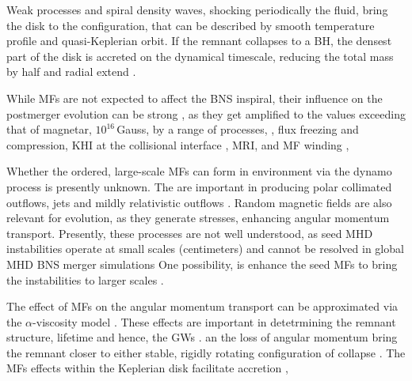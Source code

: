 Weak processes and spiral density waves, shocking periodically the fluid, 
bring the disk to the configuration, that can be described by smooth 
temperature profile 
and quasi-Keplerian orbit.
%
If the remnant collapses to a \ac{BH}, the densest part of the disk is 
accreted on the dynamical timescale, reducing the total mass by half 
and radial extend \cite{70}.

While \acp{MF} are not expected to affect the \ac{BNS} inspiral, their influence 
on the postmerger evolution can be strong \cite{73,19}, as they get amplified 
to the values exceeding that of magnetar, $10^{16}\,$Gauss, by a range of processes, 
\eg, flux freezing and compression, \ac{KHI} at the collisional interface \cite{74},
\ac{MRI}, \cite{73,19} and \ac{MF} winding \cite{73},
%

Whether the ordered, large-scale \acp{MF} can form in \pmerg{} environment 
via the dynamo process is presently unknown. The are important in producing 
polar collimated outflows, jets \cite{75,76} and mildly relativistic outflows
\cite{77,78}. Random magnetic fields are also relevant for \pmerg{} evolution, 
as they generate stresses, enhancing angular momentum transport. Presently, 
these processes are not well understood, as seed \ac{MHD} instabilities operate at 
small scales (centimeters) and cannot be resolved in global \ac{MHD} \ac{BNS} merger 
simulations
One possibility, is enhance the seed \acp{MF} to bring the instabilities to larger 
scales \cite{74,19}.

The effect of \acp{MF} on the angular momentum transport can be approximated via 
the $\alpha$-viscosity model \cite{Shakura:1972te}. These effects are important 
in detetrmining the remnant structure, lifetime and hence, the \pmerg{} \acp{GW} 
\cite{20,79}. 
an the loss of angular momentum bring the remnant closer to either stable, 
rigidly rotating configuration of collapse \cite{80}. 
%
The \acp{MF} effects within the Keplerian disk facilitate accretion \cite{24,21,78,81},

